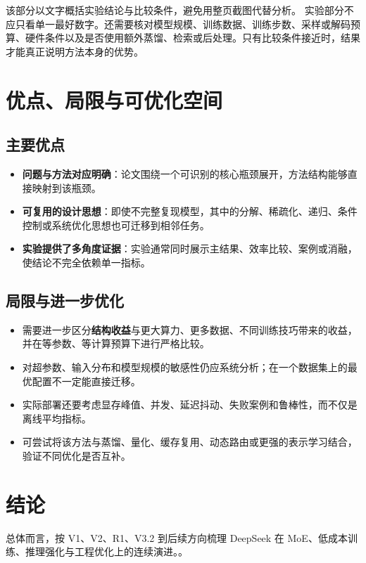 \documentclass[UTF8,11pt,a4paper]{ctexart}
\newcommand{\term}[1]{\textbf{\textcolor{mainblue}{#1}}}
\begin{document}
该部分以文字概括实验结论与比较条件，避免用整页截图代替分析。
实验部分不应只看单一最好数字。还需要核对模型规模、训练数据、训练步数、采样或解码预算、硬件条件以及是否使用额外蒸馏、检索或后处理。只有比较条件接近时，结果才能真正说明方法本身的优势。

\section{优点、局限与可优化空间}
\subsection{主要优点}
\begin{itemize}
\item \term{问题与方法对应明确}：论文围绕一个可识别的核心瓶颈展开，方法结构能够直接映射到该瓶颈。
\item \term{可复用的设计思想}：即使不完整复现模型，其中的分解、稀疏化、递归、条件控制或系统优化思想也可迁移到相邻任务。
\item \term{实验提供了多角度证据}：实验通常同时展示主结果、效率比较、案例或消融，使结论不完全依赖单一指标。
\end{itemize}

\subsection{局限与进一步优化}
\begin{itemize}
\item 需要进一步区分\term{结构收益}与更大算力、更多数据、不同训练技巧带来的收益，并在等参数、等计算预算下进行严格比较。
\item 对超参数、输入分布和模型规模的敏感性仍应系统分析；在一个数据集上的最优配置不一定能直接迁移。
\item 实际部署还要考虑显存峰值、并发、延迟抖动、失败案例和鲁棒性，而不仅是离线平均指标。
\item 可尝试将该方法与蒸馏、量化、缓存复用、动态路由或更强的表示学习结合，验证不同优化是否互补。
\end{itemize}

\section{结论}
总体而言，按 V1、V2、R1、V3.2 到后续方向梳理 DeepSeek 在 MoE、低成本训练、推理强化与工程优化上的连续演进。。
\end{document}
